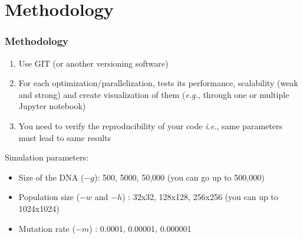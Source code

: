 \documentclass{beamer}
\begin{document}
\section{Methodology}
\begin{frame}
 \frametitle{Methodology}
\begin{enumerate}
 \item Use GIT (or another versioning software)
 \item For each optimization/parallelization, tests its performance, scalability (weak and strong) and create visualization of them (\textit{e.g.}, through one or multiple Jupyter notebook)
 \item You need to verify the reproducibility of your code \textit{i.e.}, same parameters must lead to same results
\end{enumerate}
\vfill
Simulation parameters:
\begin{itemize}
 \item Size of the DNA ($-g$): 500, 5000, 50,000 (you can go up to 500,000)
 \item Population size ($-w$ and $-h$) : 32x32, 128x128, 256x256 (you can up to 1024x1024)
 \item Mutation rate ($-m$) : 0.0001, 0.00001, 0.000001
\end{itemize}
 \end{frame}
\end{document}
